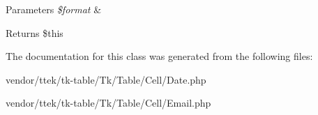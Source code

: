 \begin{DoxyParams}{Parameters}
{\em \$format} & \\
\hline
\end{DoxyParams}
\begin{DoxyReturn}{Returns}
\$this 
\end{DoxyReturn}


The documentation for this class was generated from the following files\+:\begin{DoxyCompactItemize}
\item 
vendor/ttek/tk-\/table/\+Tk/\+Table/\+Cell/Date.\+php\item 
vendor/ttek/tk-\/table/\+Tk/\+Table/\+Cell/Email.\+php\end{DoxyCompactItemize}
